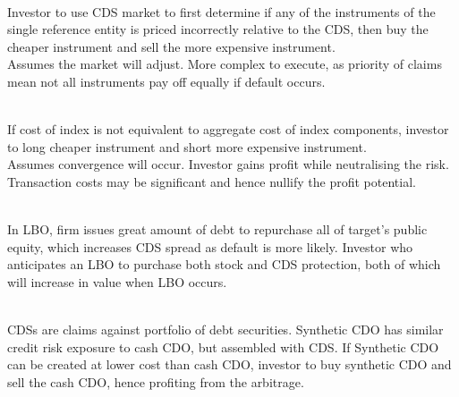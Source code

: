 \begin{remark} \\
Investor to use CDS market to first determine if any of the instruments of the single reference entity is priced incorrectly relative to the CDS, then buy the cheaper instrument and sell the more expensive instrument.\\
Assumes the market will adjust. More complex to execute, as priority of claims mean not all instruments pay off equally if default occurs.
\end{remark}

\begin{remark} \\
If cost of index is not equivalent to aggregate cost of index components, investor to long cheaper instrument and short more expensive instrument.\\
Assumes convergence will occur. Investor gains profit while neutralising the risk.\\
Transaction costs may be significant and hence nullify the profit potential.
\end{remark}

\begin{remark} \\
In LBO, firm issues great amount of debt to repurchase all of target's public equity, which increases CDS spread as default is more likely. Investor who anticipates an LBO to purchase both stock and CDS protection, both of which will increase in value when LBO occurs.
\end{remark}

\begin{remark} \\
CDSs are claims against portfolio of debt securities. Synthetic CDO has similar credit risk exposure to cash CDO, but assembled with CDS. If Synthetic CDO can be created at lower cost than cash CDO, investor to buy synthetic CDO and sell the cash CDO, hence profiting from the arbitrage.
\end{remark}

